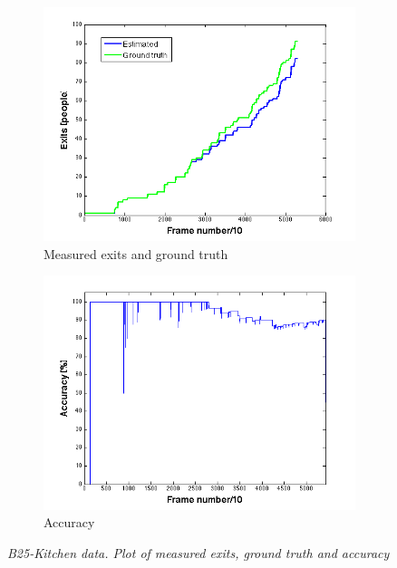 \begin{figure}[]
\centering
\begin{subfigure}{.5\textwidth}
  \centering
  \includegraphics[width=1.1\linewidth]{images/exitsGTB25.png}
  \caption{Measured exits and ground truth}
  \label{fig:sub1}
\end{subfigure}%
\begin{subfigure}{.5\textwidth}
  \centering
  \includegraphics[width=1.1\linewidth]{images/accOutB25.png}
  \caption{Accuracy}
  \label{fig:sub2}
\end{subfigure}
\caption[B25-kitchen exits]{\textit{B25-Kitchen data. Plot of measured exits, ground truth and accuracy}}
\label{fig:B25-kitchen exits}
\end{figure}
\newpage

